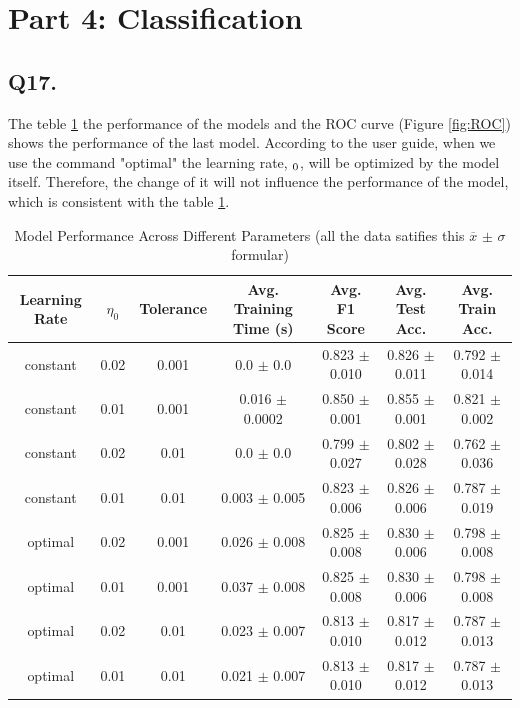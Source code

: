 \documentclass{article}
\begin{document}
\newpage

\section*{Part 4: Classification}

\subsection*{Q17.}

The teble \ref{tab:complete_model_performance} the performance of the models and the ROC curve (Figure \ref{fig:ROC}) shows the performance of the last model.
According to the user guide, when we use the command "optimal" the learning rate, $\iterate_0$, will be optimized by the model itself. Therefore, the change of it will not influence the performance of the model, which is consistent with the table \ref{tab:complete_model_performance}.

\begin{table}[htbp]
    \centering
    \small
    \begin{tabular}{ccccccc}
    \toprule
    Learning Rate & $\eta_0$ & Tolerance & Avg. Training Time (s) & Avg. F1 Score & Avg. Test Acc. & Avg. Train Acc. \\
    \midrule
    constant & 0.02 & 0.001 & 0.0 $\pm$ 0.0 & 0.823 $\pm$ 0.010 & 0.826 $\pm$ 0.011 & 0.792 $\pm$ 0.014 \\
    constant & 0.01 & 0.001 & 0.016 $\pm$ 0.0002 & 0.850 $\pm$ 0.001 & 0.855 $\pm$ 0.001 & 0.821 $\pm$ 0.002 \\
    constant & 0.02 & 0.01 & 0.0 $\pm$ 0.0 & 0.799 $\pm$ 0.027 & 0.802 $\pm$ 0.028 & 0.762 $\pm$ 0.036 \\
    constant & 0.01 & 0.01 & 0.003 $\pm$ 0.005 & 0.823 $\pm$ 0.006 & 0.826 $\pm$ 0.006 & 0.787 $\pm$ 0.019 \\
    optimal & 0.02 & 0.001 & 0.026 $\pm$ 0.008 & 0.825 $\pm$ 0.008 & 0.830 $\pm$ 0.006 & 0.798 $\pm$ 0.008 \\
    optimal & 0.01 & 0.001 & 0.037 $\pm$ 0.008 & 0.825 $\pm$ 0.008 & 0.830 $\pm$ 0.006 & 0.798 $\pm$ 0.008 \\
    optimal & 0.02 & 0.01 & 0.023 $\pm$ 0.007 & 0.813 $\pm$ 0.010 & 0.817 $\pm$ 0.012 & 0.787 $\pm$ 0.013 \\
    optimal & 0.01 & 0.01 & 0.021 $\pm$ 0.007 & 0.813 $\pm$ 0.010 & 0.817 $\pm$ 0.012 & 0.787 $\pm$ 0.013 \\
    \bottomrule
    \end{tabular}
    \caption{Model Performance Across Different Parameters  (all the data satifies this $\overline{x}$ $\pm$ $\sigma$ formular)}
    \label{tab:complete_model_performance}
\end{table}
    
\end{document}
